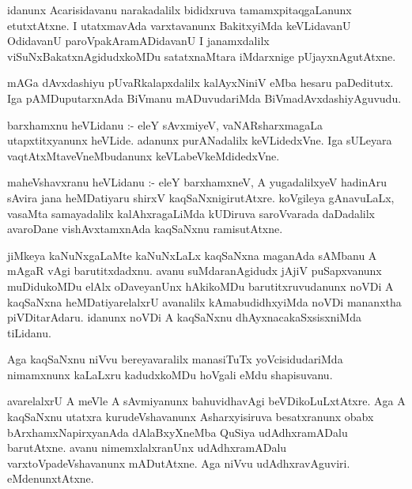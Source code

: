\documentclass{article}
\begin{document}
\begin{mn}
idanunx  Acarisidavanu  narakadalilx  bididxruva  tamamxpitaqgaLanunx  etutxtAtxne.  I  utatxmavAda  
varxtavanunx  BakitxyiMda  keVLidavanU  OdidavanU  paroVpakAramADidavanU  I  janamxdalilx  
viSuNxBakatxnAgidudxkoMDu  satatxnaMtara  iMdarxnige  pUjayxnAgutAtxne. 
\end{mn}

\begin{mn}
mAGa  dAvxdashiyu  pUvaRkalapxdalilx  kalAyxNiniV  eMba  hesaru  paDeditutx.  Iga  pAMDuputarxnAda  
BiVmanu  mADuvudariMda  BiVmadAvxdashiyAguvudu.
\end{mn}

\begin{mn}
barxhamxnu  heVLidanu :- eleY  sAvxmiyeV,  vaNARsharxmagaLa  utapxtitxyanunx  heVLide.  adanunx  
purANadalilx  keVLidedxVne.  Iga  sULeyara  vaqtAtxMtaveVneMbudanunx  keVLabeVkeMdidedxVne.
\end{mn}

\begin{mn}
maheVshavxranu  heVLidanu :- eleY  barxhamxneV,  A  yugadalilxyeV  hadinAru  sAvira  jana  heMDatiyaru  
shirxV kaqSaNxnigirutAtxre.  koVgileya  gAnavuLaLx,  vasaMta  samayadalilx  kalAhxragaLiMda  kUDiruva  
saroVvarada  daDadalilx  avaroDane  vishAvxtamxnAda  kaqSaNxnu  ramisutAtxne.
\end{mn}

\begin{mn}
jiMkeya  kaNuNxgaLaMte  kaNuNxLaLx  kaqSaNxna  maganAda  sAMbanu  A  mAgaR vAgi  barutitxdadxnu.  
avanu  suMdaranAgidudx  jAjiV  puSapxvanunx  muDidukoMDu  elAlx  oDaveyanUnx  hAkikoMDu  
barutitxruvudanunx  noVDi  A  kaqSaNxna  heMDatiyarelalxrU  avanalilx  kAmabudidhxyiMda  noVDi  
mananxtha  piVDitarAdaru.  idanunx  noVDi  A  kaqSaNxnu  dhAyxnacakaSxsisxniMda  tiLidanu.
\end{mn}

\begin{mn}
Aga  kaqSaNxnu  niVvu  bereyavaralilx  manasiTuTx  yoVcisidudariMda  nimamxnunx  kaLaLxru  
kadudxkoMDu  hoVgali  eMdu  shapisuvanu.  
\end{mn}

\begin{mn}
avarelalxrU  A meVle  A  sAvmiyanunx  bahuvidhavAgi  beVDikoLuLxtAtxre.  Aga  A  kaqSaNxnu  
utatxra  kurudeVshavanunx  Asharxyisiruva  besatxranunx  obabx  bArxhamxNapirxyanAda  
dAlaBxyXneMba  QuSiya  udAdhxramADalu  barutAtxne.  avanu  nimemxlalxranUnx  udAdhxramADalu  
varxtoVpadeVshavanunx  mADutAtxne.  Aga  niVvu  udAdhxravAguviri.  eMdenunxtAtxne.
\end{mn}
\end{document}
